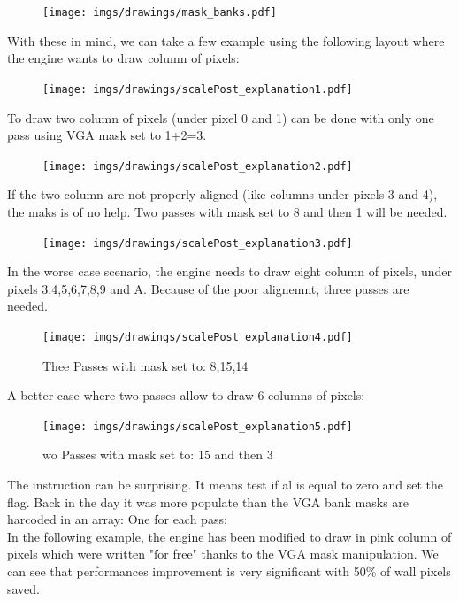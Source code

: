 \begin{figure}[H]
\centering
 \texttt{[image: imgs/drawings/mask\_banks.pdf]}
 \end{figure}


With these in mind, we can take a few example using the following layout where the engine wants to draw column of pixels:
\begin{figure}[H]
\centering
 \texttt{[image: imgs/drawings/scalePost\_explanation1.pdf]}
 \end{figure}


 To draw two column of pixels (under pixel 0 and 1) can be done with only one pass using VGA mask set to 1+2=3.\\
 \begin{figure}[H]
 \centering
 \texttt{[image: imgs/drawings/scalePost\_explanation2.pdf]}
 \end{figure}





If the two column are not properly aligned (like columns under pixels 3 and 4), the maks is of no help. Two passes with mask set to 8 and then 1 will be needed.
  \begin{figure}[H]
 \centering
 \texttt{[image: imgs/drawings/scalePost\_explanation3.pdf]}
 \end{figure}


In the worse case scenario, the engine needs to draw eight column of pixels, under pixels 3,4,5,6,7,8,9 and A. Because of the poor alignemnt, three passes are needed.
  \begin{figure}[H]
 \centering
 \texttt{[image: imgs/drawings/scalePost\_explanation4.pdf]}
 \caption{Thee Passes with mask set to: 8,15,14}
 \end{figure}


A better case where two passes allow to draw 6 columns of pixels:
   \begin{figure}[H]
 \centering
 \texttt{[image: imgs/drawings/scalePost\_explanation5.pdf]}
  \caption{wo Passes with mask set to: 15 and then 3}
 \end{figure}


The instruction  can be surprising. It means test if al is equal to zero and set the flag. Back in the day it was more populate than 
 the VGA bank masks are harcoded in an array: One for each pass:\\



In the following example, the engine has been modified to draw in pink column of pixels which were written "for free" thanks to the VGA mask manipulation. We can see that performances improvement is very significant with 50\% of wall pixels saved.

